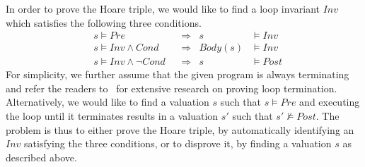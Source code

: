 In order to prove the Hoare triple, we would like to find a loop invariant $\mathit{Inv}$ which satisfies the following three conditions.
\begin{align}
    &s \models \mathit{Pre}
        &&\Longrightarrow & s &\models \mathit{Inv} \label{inv:pre} \\
    &s \models \mathit{Inv} \wedge \mathit{Cond}
        &&\Longrightarrow & \mathit{Body}(s) &\models \mathit{Inv} \label{inv:loop} \\
    &s \models \mathit{Inv} \wedge \neg \mathit{Cond}
        &&\Longrightarrow & s &\models \mathit{Post} \label{inv:post}
\end{align}
For simplicity, we further assume that the given program is always terminating and refer the readers to~\cite{} for extensive research on proving loop termination.
Alternatively, we would like to find a valuation $s$ such that $s \models \mathit{Pre}$ and executing the loop until it terminates results in a valuation $s'$ such that $s' \not \models Post$.
The problem is thus to either prove the Hoare triple, by automatically identifying an $\mathit{Inv}$ satisfying the three conditions, or to disprove it, by finding a valuation $s$ as described above.

